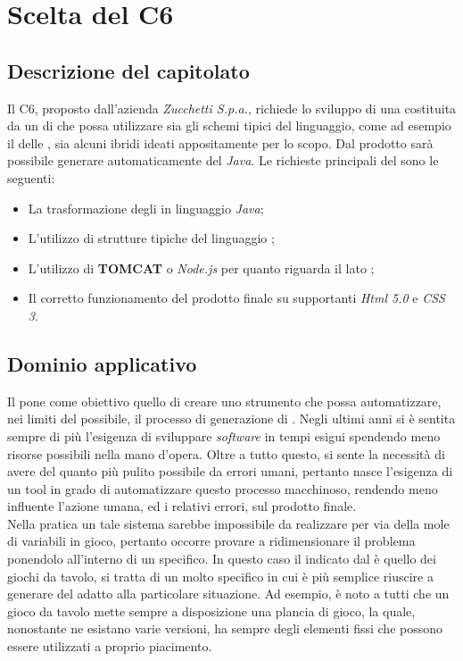 \section{Scelta del  C6}
  \subsection{Descrizione del capitolato}
    Il  C6, proposto dall'azienda \emph{Zucchetti S.p.a.}, richiede lo sviluppo di una  costituita da un  di  che possa utilizzare sia gli schemi tipici
    del linguaggio, come ad esempio il  delle , sia alcuni ibridi ideati appositamente per lo scopo.
    Dal  prodotto sarà possibile generare automaticamente del  \emph{Java}.
    Le richieste principali del  sono le seguenti:
    \begin{itemize}
      \item La trasformazione degli  in linguaggio \emph{Java};
      \item L'utilizzo di strutture tipiche del linguaggio ;
      \item L'utilizzo di \textbf{TOMCAT} o \emph{Node.js} per quanto riguarda il lato ;
      \item Il corretto funzionamento del prodotto finale su  supportanti \emph{Html 5.0} e \emph{CSS 3}.
     \end{itemize}
   \subsection{Dominio applicativo}
    Il  pone come obiettivo quello di creare uno strumento che possa automatizzare, nei limiti del possibile, il processo di generazione di .
    Negli ultimi anni si è sentita sempre di più l'esigenza di sviluppare \emph{software} in tempi esigui spendendo meno risorse possibili nella mano d'opera.
    Oltre a tutto questo, si sente la necessità di avere del  quanto più pulito possibile da errori umani, pertanto nasce l'esigenza di un tool in grado di
    automatizzare questo processo macchinoso, rendendo meno influente l'azione umana, ed i relativi errori, sul prodotto finale. \\
    Nella pratica un tale sistema sarebbe impossibile da realizzare per via della mole di variabili in gioco, pertanto occorre provare a ridimensionare il problema ponendolo
    all'interno di un  specifico.
    In questo caso il  indicato dal  è quello dei giochi da tavolo, si tratta di un  molto specifico in cui è più semplice riuscire a generare del  adatto alla particolare situazione.
    Ad esempio, è noto a tutti che un gioco da tavolo mette sempre a disposizione una plancia di gioco, la quale, nonostante ne esistano varie versioni, ha sempre degli
    elementi fissi che possono essere utilizzati a proprio piacimento.

